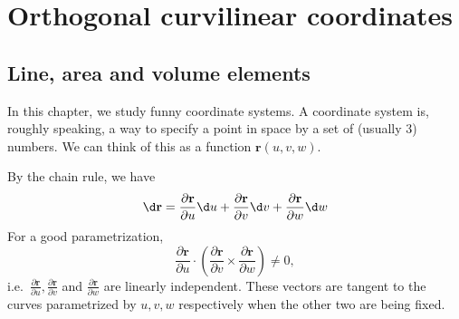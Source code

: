 \documentclass[a4paper]{article}
\begin{document}
\section{Orthogonal curvilinear coordinates}
\subsection{Line, area and volume elements}
In this chapter, we study funny coordinate systems. A coordinate system is, roughly speaking, a way to specify a point in space by a set of (usually 3) numbers. We can think of this as a function $\mathbf{r}(u, v, w)$.

By the chain rule, we have
\[
  \d \mathbf{r} = \frac{\partial \mathbf{r}}{\partial u}\d u + \frac{\partial \mathbf{r}}{\partial v}\d v + \frac{\partial \mathbf{r}}{\partial w}\d w
\]
For a good parametrization,
\[
  \frac{\partial \mathbf{r}}{\partial u}\cdot \left(\frac{\partial \mathbf{r}}{\partial v}\times \frac{\partial \mathbf{r}}{\partial w}\right) \not = 0,
\]
i.e.\ $\frac{\partial \mathbf{r}}{\partial u}, \frac{\partial \mathbf{r}}{\partial v}$ and $\frac{\partial \mathbf{r}}{\partial w}$ are linearly independent. These vectors are tangent to the curves parametrized by $u, v, w$ respectively when the other two are being fixed.
\end{document}
